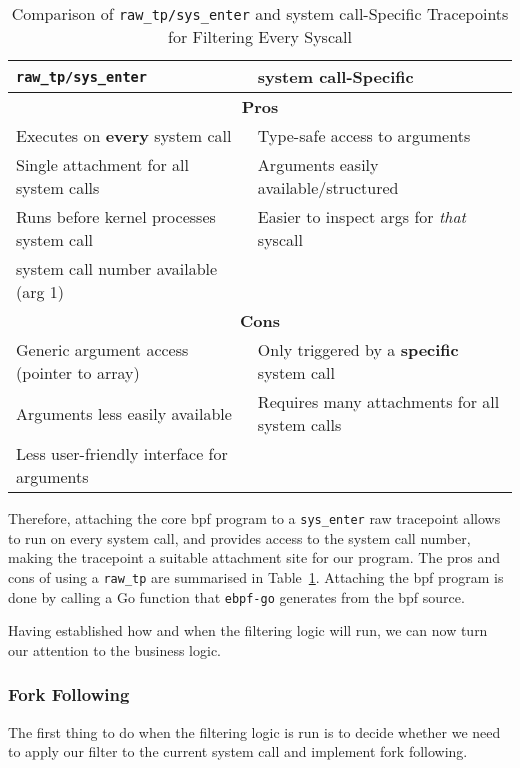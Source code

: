 \begin{table}[h!]
\centering
\caption{Comparison of \texttt{raw\_tp/sys\_enter} and system call-Specific Tracepoints for Filtering Every Syscall}
\begin{tabular}{|p{6cm}|p{6cm}|}
\hline
\texttt{raw\_tp/sys\_enter} & \textbf{system call-Specific} \\
\hline
\multicolumn{2}{|c|}{\textbf{Pros}} \\
\hline
Executes on \textbf{every} system call & Type-safe access to arguments \\
Single attachment for all system calls & Arguments easily available/structured \\
Runs before kernel processes system call & Easier to inspect args for \textit{that} syscall \\
system call number available (arg 1) &  \\
\hline
\multicolumn{2}{|c|}{\textbf{Cons}} \\
\hline
Generic argument access (pointer to array) & Only triggered by a \textbf{specific} system call \\
Arguments less easily available & Requires many attachments for all system calls \\
Less user-friendly interface for arguments &  \\
\hline
\end{tabular}
\label{tab:tracepoint_comparison}
\end{table}

Therefore, attaching the core \ac{bpf} program to a \texttt{sys\_enter} raw
tracepoint allows \af to run on every system call, and provides access to the
system call number, making the tracepoint a suitable attachment site for our
program. The pros and cons of using a \texttt{raw\_tp} are summarised in
Table~\ref{tab:tracepoint_comparison}. Attaching the \ac{bpf} program is done by calling a Go function that
\texttt{ebpf-go} generates from the \ac{bpf} source. 

Having established how and when the \af filtering logic will run, we can now
turn our attention to the business logic.

\subsubsection{Fork Following}

The first thing to do when the filtering logic is run is to decide whether we
need to apply our filter to the current system call and implement fork following. 

